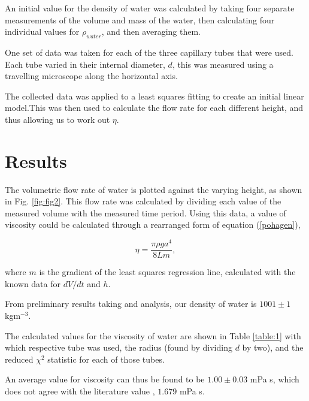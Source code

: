 \documentclass[twocolumn]{revtex4}
\newcommand{\squeezeup}{\vspace{-2.5mm}}
\begin{document}
\squeezeup
\squeezeup

An initial value for the density of water was calculated by taking four separate measurements of the volume and mass of the water, then calculating four individual values for $\rho_{water}$, and then averaging them.

One set of data was taken for each of the three capillary tubes that were used. Each tube varied in their internal diameter, $d$, this was measured using a travelling microscope along the horizontal axis. 

The collected data was applied to a least squares fitting to create an initial linear model.This was then used to calculate the flow rate for each different height, and thus allowing us to work out $\eta$.

\vspace{-3ex}
\section{Results}
\vspace{-2ex}

The volumetric flow rate of water is plotted against the varying height, as shown in Fig. \ref{fig:fig2}. This flow rate was calculated by dividing each value of the measured volume with the measured time period. Using this data, a value of viscosity could be calculated through a rearranged form of equation (\ref{pohagen}),

\squeezeup

\begin{equation} 
\eta=\frac{\pi \rho g a^4 }{8 L m}, 
\label{r-pohagen}
\end{equation}

where $m$ is the gradient of the least squares regression line, calculated with the known data for $dV/dt$ and $h$.

From preliminary results taking and analysis, our density of water is ${1001 \pm 1}$ kgm$^{-3}$.

The calculated values for the viscosity of water are shown in Table \ref{table:1} with which respective tube was used, the radius (found by dividing $d$ by two), and the reduced $\chi^2$ statistic for each of those tubes. 

An average value for viscosity can thus be found to be $1.00 \pm 0.03$ mPa s, which does not agree with the literature value \cite{crc}, $1.679$  mPa {s}. 
\end{document}
